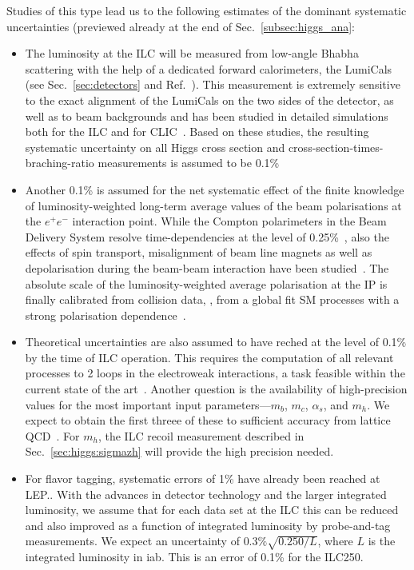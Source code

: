 Studies of this type lead us to the following estimates of the dominant systematic uncertainties (previewed already at the end of Sec.~\ref{subsec:higgs_ana}:
\begin{itemize}
\item The luminosity at the ILC will be measured from low-angle Bhabha scattering with the help of a dedicated forward calorimeters, the LumiCals (see Sec.~\ref{sec:detectors} and Ref.~\cite{Abramowicz:2010bg}). This measurement is extremely sensitive to the exact alignment of the LumiCals on the two sides of the detector, as well as to beam backgrounds and has been studied in detailed simulations both for the ILC and for CLIC~\cite{Bozovic-Jelisavcic:2014aza, Lukic:2013fw}. Based on these studies, the resulting systematic uncertainty on all Higgs cross section and cross-section-times-braching-ratio measurements is assumed to be 0.1\%
\item Another 0.1\% is assumed for the net systematic effect of the finite knowledge of luminosity-weighted long-term average values of the beam polarisations at the $e^+e^-$ interaction point. While the Compton polarimeters in the Beam Delivery System resolve time-dependencies at the level of 0.25\%~\cite{Vormwald:2015hla, List:2015lsa}, also the effects of spin transport, misalignment of beam line magnets as well as depolarisation during the beam-beam interaction have been studied~\cite{Beckmann:2014mka}. The absolute scale of the luminosity-weighted average polarisation at the IP is finally calibrated from collision data, \eg, from a global fit SM processes with a strong polarisation dependence~\cite{bib:PhDRobert}. 
\item Theoretical uncertainties are also assumed to have reched at the level of 0.1\% by the time of ILC operation.   This requires the computation of all relevant processes to 2 loops in the electroweak interactions, a task feasible within the current state of the art~\cite{Blondel:2019qlh}.  Another question is the availability of high-precision values for the most important input parameters---$m_b$, $m_c$, $\alpha_s$, and $m_h$.  We expect to obtain the first threee  of these to sufficient accuracy from lattice QCD~\cite{Lepage:2014fla}.
For $m_h$, the  ILC recoil measurement described in Sec.~\ref{sec:higgs:sigmazh} will provide 
the high precision needed.
\item For flavor tagging, systematic errors of 1\% have already been reached at LEP.. With the advances in detector technology and the larger integrated luminosity, we assume that for each data set at the ILC this can be reduced  and also improved as  a function of integrated luminosity by probe-and-tag measurements.   We expect an uncertainty of 
$0.3\% \sqrt{0.250/L}$, where $L$ is the integrated luminosity in iab.  This is an error of 0.1\% for the ILC250.


\end{itemize}
